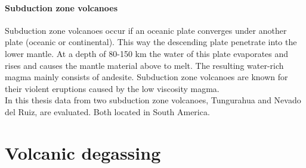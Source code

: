 \documentclass  [
  paper    = a4,
  BCOR     = 10mm,
  twoside,
  fontsize = 12pt,
  fleqn,
  toc      = bibnumbered,
  toc      = listofnumbered,
  numbers  = noendperiod,
  headings = normal,
  listof   = leveldown,
  version  = 3.03
]                                       {scrreprt}
\begin{document}
\paragraph{ Subduction zone volcanoes}
Subduction zone volcanoes occur if an oceanic plate converges under another plate (oceanic or continental). This way the descending plate penetrate into the lower mantle. At a depth of 80-150 km the water of this plate evaporates and rises and causes the mantle material above to melt. The resulting water-rich magma mainly consists of andesite. Subduction zone volcanoes are known for their violent eruptions caused by the low viscosity magma.\\
In this thesis data from two subduction zone volcanoes, Tungurahua and Nevado del Ruiz, are evaluated. Both located in South America.
\section{Volcanic degassing}
\end{document}
